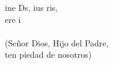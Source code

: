 \begin{cancion}%
	ine Ds, ius ris,\\
	ere i\\
	\jump\\
(Señor Dios, Hijo del Padre,\\
 ten piedad de nosotros)\\
\end{cancion}%
